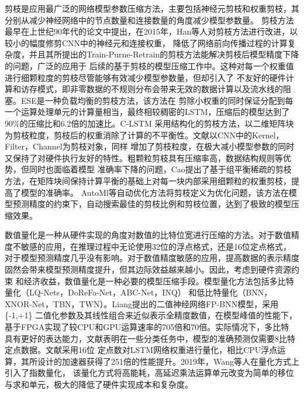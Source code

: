 剪枝是应用最广泛的网络模型参数压缩方法，主要包括神经元剪枝和权重剪枝，其分别从减少神经网络中的节点数量和连接数量的角度减少模型参数量。
剪枝方法最早在上世纪90年代的论文中提出，在2015年，Han等人对剪枝方法进行改进，以较小的幅度修剪CNN中的神经元和连接权重，
降低了网络前向传播过程的计算复杂度，并且其所提出的Train-Purne-Retrain的剪枝方法能解决剪枝后模型精度下降的问题，广泛的应用于
后续的基于剪枝的模型压缩工作中。这种对每一个权重值进行细颗粒度的剪枝尽管能够有效减少模型参数量，但却引入了
不友好的硬件计算和访存模式，即非零数据的不规则分布会带来无效的数据计算以及流水线的阻塞。ESE是一种负载均衡的剪枝方法，该方法在
剪除小权重的同时保证分配到每一个运算处理单元的计算量相当，最终相较稠密的LSTM，压缩后的模型达到了90\%的压缩比和6.2倍的加速比。C-LSTM
采用结构化的剪枝方法，以二维矩阵块为剪枝粒度，剪枝后的权重消除了计算的不平衡性。文献以CNN中的Kernel，Filter，Channel为剪枝对象，同样
增加了剪枝粒度，在极大减小模型参数的同时又保持了对硬件执行友好的特性。粗颗粒剪枝具有压缩率高，数据结构规则等优势，但同时也面临着模型
准确率下降的问题，Cao提出了基于组平衡稀疏的剪枝方法，在矩阵块间保持计算平衡的基础上对每一块内部采用细颗粒的权重剪枝，提高了模型的准确率。
AutoMl等自动优化方法将剪枝定义为优化问题，该方法在模型预测精度的约束下，自动搜索最佳的剪枝比例和剪枝位置，达到了极致的模型压缩效果。

数值量化是一种从硬件实现的角度对数值的比特位宽进行压缩的方法。对于数值精度不敏感的应用，在推理过程中无论使用32位的浮点格式，还是16位定点格式，
对于模型预测精度几乎没有影响。对于数值精度敏感的应用，提高数据的表示精度固然会带来模型预测精度提升，但其边际效益越来越小。因此，考虑到硬件资源约束
和经济收益，数值量化是一种必要的模型压缩手段。模型量化方法包括多比特量化（LQ-Nets，DoReFa-Net，ABC-Net，INQ）
和低比特量化（BNN，XNOR-Net，TBN，TWN）。Liang提出的二值神经网络FP-BNN模型，采用\{-1,+1\}
二值化参数及其线性组合来近似表示全精度数值，在模型峰值的性能下，基于FPGA实现了较CPU和GPU运算速率的705倍和70倍。实际情况下，多比特
具有更好的表达能力，文献表明在一些分类任务中，模型的准确预测仅需要8比特定点数据。文献采用16位
定点数对LSTM网络权重进行量化，相比CPU浮点运算，其所设计的加速器获得了251倍的性能提升。2019年，Wang等人在量化方式上引入了指数量化，
该量化方式将高能耗，高延迟乘法运算单元改变为简单的移位与求和单元，极大的降低了硬件实现成本和复杂度。

